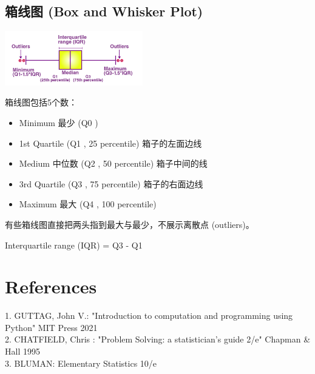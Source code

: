 \hypertarget{ux7bb1ux7ebfux56fe-box-and-whisker-plot}{%
\subsection{箱线图 (Box and Whisker
Plot)}\label{ux7bb1ux7ebfux56fe-box-and-whisker-plot}}

\includegraphics[width=6cm]{BoxWhiskerScreenshot_2021-08-02_214603.png}

箱线图包括5个数：

\begin{itemize}
\tightlist
\item
  Minimum 最少 (Q0 )
\item
  1st Quartile (Q1 , 25 percentile) 箱子的左面边线
\item
  Medium 中位数 (Q2 , 50 percentile) 箱子中间的线
\item
  3rd Quartile (Q3 , 75 percentile) 箱子的右面边线
\item
  Maximum 最大 (Q4 , 100 percentile)
\end{itemize}

有些箱线图直接把两头指到最大与最少，不展示离散点 (outliers)。

Interquartile range (IQR) = Q3 - Q1


\hypertarget{references}{%
\section{References}\label{references}}

1. GUTTAG, John V.: "Introduction to computation and programming using
Python" MIT Press 2021\\
2. CHATFIELD, Chris : "Problem Solving: a statistician's guide 2/e"
Chapman \& Hall 1995\\
3. BLUMAN: Elementary Statistics 10/e\\



